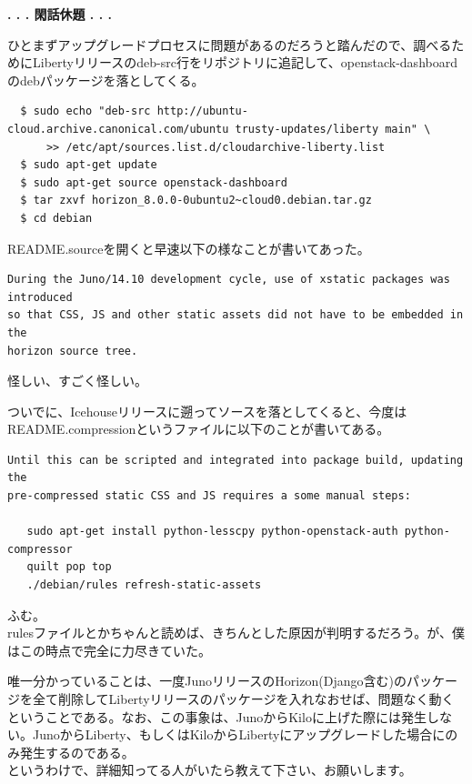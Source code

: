 \documentclass[9pt,b5paper,tombo,openany]{jsbook}
\begin{document}
\noindent
\textbf{. . . 閑話休題 . . .}

ひとまずアップグレードプロセスに問題があるのだろうと踏んだので、調べるためにLibertyリリースのdeb-src行をリポジトリに追記して、openstack-dashboardのdebパッケージを落としてくる。

\begin{lstlisting}
  $ sudo echo "deb-src http://ubuntu-cloud.archive.canonical.com/ubuntu trusty-updates/liberty main" \
      >> /etc/apt/sources.list.d/cloudarchive-liberty.list
  $ sudo apt-get update
  $ sudo apt-get source openstack-dashboard
  $ tar zxvf horizon_8.0.0-0ubuntu2~cloud0.debian.tar.gz
  $ cd debian
\end{lstlisting}

\noindent
README.sourceを開くと早速以下の様なことが書いてあった。

\begin{lstlisting}
During the Juno/14.10 development cycle, use of xstatic packages was introduced
so that CSS, JS and other static assets did not have to be embedded in the
horizon source tree.
\end{lstlisting}

\noindent
怪しい、すごく怪しい。

ついでに、Icehouseリリースに遡ってソースを落としてくると、今度はREADME.compressionというファイルに以下のことが書いてある。

\begin{lstlisting}
Until this can be scripted and integrated into package build, updating the
pre-compressed static CSS and JS requires a some manual steps:

   sudo apt-get install python-lesscpy python-openstack-auth python-compressor
   quilt pop top
   ./debian/rules refresh-static-assets
\end{lstlisting}

\noindent
ふむ。\\[1ex]

rulesファイルとかちゃんと読めば、きちんとした原因が判明するだろう。が、僕はこの時点で完全に力尽きていた。

唯一分かっていることは、一度JunoリリースのHorizon(Django含む)のパッケージを全て削除してLibertyリリースのパッケージを入れなおせば、問題なく動くということである。なお、この事象は、JunoからKiloに上げた際には発生しない。JunoからLiberty、もしくはKiloからLibertyにアップグレードした場合にのみ発生するのである。\\[1ex]

\noindent
というわけで、詳細知ってる人がいたら教えて下さい、お願いします。\\[1ex]
\end{document}
